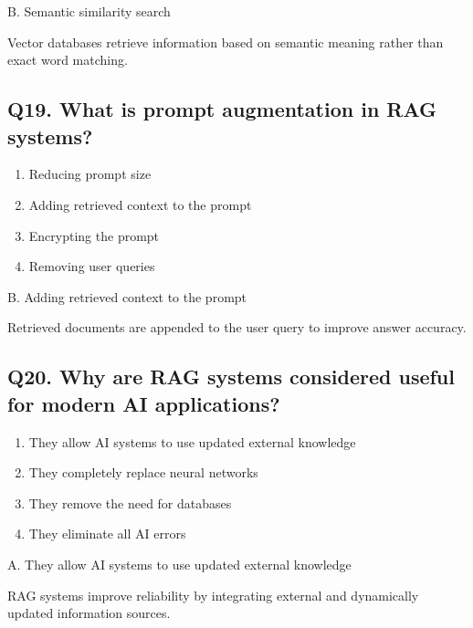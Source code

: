 \documentclass[12pt,a4paper]{article}
\begin{document}
\begin{tcolorbox}[colback=mid,colframe=softblue,title=Correct Answer]
B. Semantic similarity search

Vector databases retrieve information based on semantic meaning rather than exact word matching.
\end{tcolorbox}


\subsection*{Q19. What is prompt augmentation in RAG systems?}

\begin{enumerate}[label=\Alph*.]
\item Reducing prompt size
\item Adding retrieved context to the prompt
\item Encrypting the prompt
\item Removing user queries
\end{enumerate}

\begin{tcolorbox}[colback=mid,colframe=softblue,title=Correct Answer]
B. Adding retrieved context to the prompt

Retrieved documents are appended to the user query to improve answer accuracy.
\end{tcolorbox}


\subsection*{Q20. Why are RAG systems considered useful for modern AI applications?}

\begin{enumerate}[label=\Alph*.]
\item They allow AI systems to use updated external knowledge
\item They completely replace neural networks
\item They remove the need for databases
\item They eliminate all AI errors
\end{enumerate}

\begin{tcolorbox}[colback=mid,colframe=softblue,title=Correct Answer]
A. They allow AI systems to use updated external knowledge

RAG systems improve reliability by integrating external and dynamically updated information sources.
\end{tcolorbox}
\end{document}
